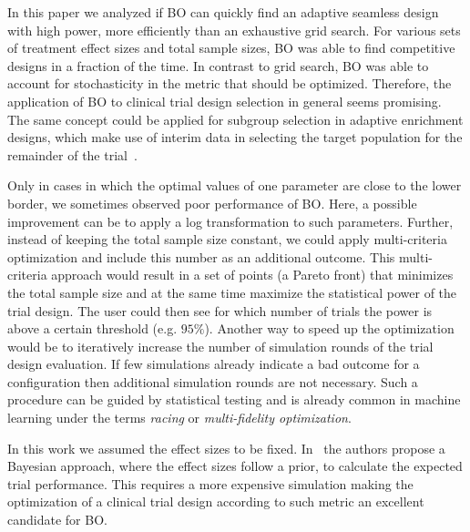 \documentclass[bimj,fleqn]{w-art}
\theoremstyle{plain}
\theoremstyle{definition}
\begin{document}

In this paper we analyzed if BO can quickly find an adaptive seamless design with high power, more efficiently than an exhaustive grid search.
For various sets of treatment effect sizes and total sample sizes, BO was able to find competitive designs in a fraction of the time.
In contrast to grid search, BO was able to account for stochasticity in the metric that should be optimized.
Therefore, the application of BO to clinical trial design selection in general seems promising. The same concept could be applied for subgroup selection in adaptive enrichment designs, which make use of interim data in selecting the target population for the remainder of the trial~\citep{burnett_adaptive_2020}.

Only in cases in which the optimal values of one parameter are close to the lower border, we sometimes observed poor performance of BO.
Here, a possible improvement can be to apply a log transformation to such parameters. %
Further, instead of keeping the total sample size constant, we could apply multi-criteria optimization and include this number as an additional outcome.
This multi-criteria approach would result in a set of points (a Pareto front) that minimizes the total sample size and at the same time maximize the statistical power of the trial design.
The user could then see for which number of trials the power is above a certain threshold (e.g. $95\%$).
Another way to speed up the optimization would be to iteratively increase the number of simulation rounds of the trial design evaluation. 
If few simulations already indicate a bad outcome for a configuration then additional simulation rounds are not necessary.
Such a procedure can be guided by statistical testing and is already common in machine learning under the terms \emph{racing} or \emph{multi-fidelity optimization}.

In this work we assumed the effect sizes to be fixed. %
In~\citet{stallard_optimal_2009} the authors propose a Bayesian approach, where the effect sizes follow a prior, to calculate the expected trial performance.
This requires a more expensive simulation making the optimization of a clinical trial design according to such metric an excellent candidate for BO.
\end{document}
